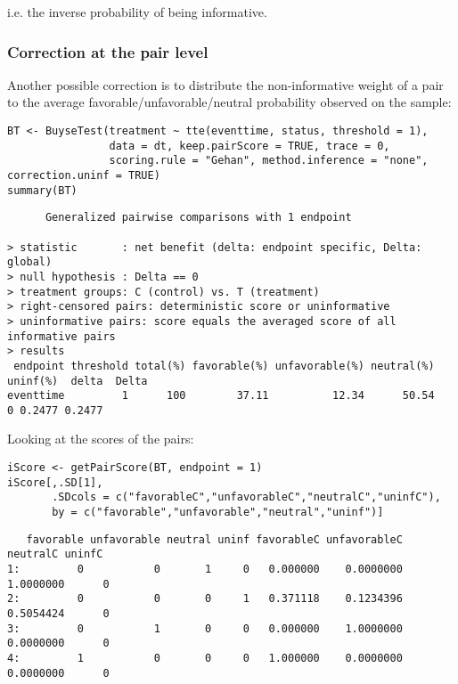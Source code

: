 \documentclass[12pt]{article}
\begin{document}
i.e. the inverse probability of being informative. 

\subsubsection{Correction at the pair level}
\label{sec:org07c585d}

Another possible correction is to distribute the non-informative
weight of a pair to the average favorable/unfavorable/neutral
probability observed on the sample:
\lstset{language=r,label= ,caption= ,captionpos=b,numbers=none}
\begin{lstlisting}
BT <- BuyseTest(treatment ~ tte(eventtime, status, threshold = 1),
				data = dt, keep.pairScore = TRUE, trace = 0,
				scoring.rule = "Gehan", method.inference = "none", correction.uninf = TRUE)
summary(BT)
\end{lstlisting}

\begin{verbatim}
      Generalized pairwise comparisons with 1 endpoint

> statistic       : net benefit (delta: endpoint specific, Delta: global) 
> null hypothesis : Delta == 0 
> treatment groups: C (control) vs. T (treatment) 
> right-censored pairs: deterministic score or uninformative
> uninformative pairs: score equals the averaged score of all informative pairs
> results
 endpoint threshold total(%) favorable(%) unfavorable(%) neutral(%) uninf(%)  delta  Delta
eventtime         1      100        37.11          12.34      50.54        0 0.2477 0.2477
\end{verbatim}


Looking at the scores of the pairs:
\lstset{language=r,label= ,caption= ,captionpos=b,numbers=none}
\begin{lstlisting}
iScore <- getPairScore(BT, endpoint = 1)
iScore[,.SD[1], 
	   .SDcols = c("favorableC","unfavorableC","neutralC","uninfC"),
	   by = c("favorable","unfavorable","neutral","uninf")]
\end{lstlisting}

\begin{verbatim}
   favorable unfavorable neutral uninf favorableC unfavorableC  neutralC uninfC
1:         0           0       1     0   0.000000    0.0000000 1.0000000      0
2:         0           0       0     1   0.371118    0.1234396 0.5054424      0
3:         0           1       0     0   0.000000    1.0000000 0.0000000      0
4:         1           0       0     0   1.000000    0.0000000 0.0000000      0
\end{verbatim}
\end{document}
